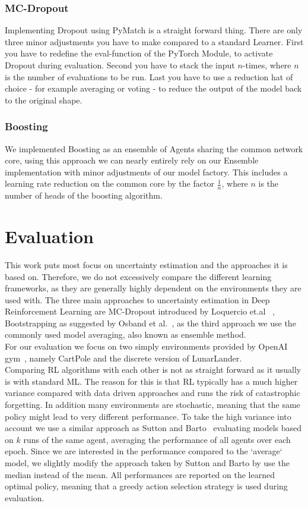 \documentclass[11pt,a4paper]{article}
\begin{document}
	\subsubsection{MC-Dropout}
	Implementing Dropout using PyMatch is a straight forward thing.
	There are only three minor adjustments you have to make compared to a standard Learner.
	First you have to redefine the eval-function of the PyTorch Module, to activate Dropout during evaluation.
	Second you have to stack the input $n$-times, where $n$ is the number of evaluations to be run.
	Last you have to use a reduction hat of choice - for example averaging or voting - to reduce the output of the model back to the original shape.
	
	\subsubsection{Boosting}
	We implemented Boosting as an ensemble of Agents sharing the common network core, using this approach we can nearly entirely rely on our Ensemble implementation with minor adjustments of our model factory.
	This includes a learning rate reduction on the common core by the factor $\frac{1}{n}$, where $n$ is the number of heads of the boosting algorithm.

	\section{Evaluation}\label{sec:evaluation}
	This work puts most focus on uncertainty estimation and the approaches it is based on.
	Therefore, we do not excessively compare the different learning frameworks, as they are generally highly dependent on the environments they are used with.
	The three main approaches to uncertainty estimation in Deep Reinforcement Learning are MC-Dropout introduced by Loquercio et.al ~\cite{loquercio_general_2020}, Bootstrapping as suggested by Osband et al.~\cite{osband_deep_2016}, as the third approach we use the commonly used model averaging, also known as ensemble method.\\
	For our evaluation we focus on two simply environments provided by OpenAI gym~\cite{openai_gym_nodate}, namely CartPole and the discrete version of LunarLander.\\

	Comparing RL algorithms with each other is not as straight forward as it usually is with standard ML.
	The reason for this is that RL typically has a much higher variance compared with data driven approaches and runs the risk of catastrophic forgetting.
	In addition many environments are stochastic, meaning that the same policy might lead to very different performance.
	To take the high variance into account we use a similar approach as Sutton and Barto~\cite{sutton_introduction_1998} evaluating models based on $k$ runs of the same agent, averaging the performance of all agents over each epoch.
	Since we are interested in the performance compared to the `average` model, we slightly modify the approach taken by Sutton and Barto by use the median instead of the mean.
	All performances are reported on the learned optimal policy, meaning that a greedy action selection strategy is used during evaluation.
\end{document}
